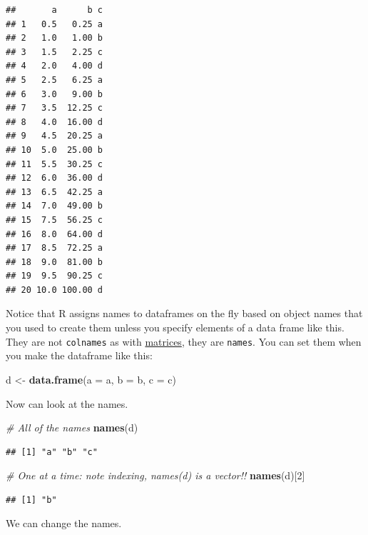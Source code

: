 \documentclass[
]{book}
\newenvironment{Shaded}{\begin{snugshade}}{\end{snugshade}}
\newcommand{\CommentTok}[1]{\textcolor[rgb]{0.56,0.35,0.01}{\textit{#1}}}
\newcommand{\DataTypeTok}[1]{\textcolor[rgb]{0.13,0.29,0.53}{#1}}
\newcommand{\DecValTok}[1]{\textcolor[rgb]{0.00,0.00,0.81}{#1}}
\newcommand{\KeywordTok}[1]{\textcolor[rgb]{0.13,0.29,0.53}{\textbf{#1}}}
\newcommand{\NormalTok}[1]{#1}
\newcommand{\StringTok}[1]{\textcolor[rgb]{0.31,0.60,0.02}{#1}}
\begin{document}
\begin{verbatim}
##       a      b c
## 1   0.5   0.25 a
## 2   1.0   1.00 b
## 3   1.5   2.25 c
## 4   2.0   4.00 d
## 5   2.5   6.25 a
## 6   3.0   9.00 b
## 7   3.5  12.25 c
## 8   4.0  16.00 d
## 9   4.5  20.25 a
## 10  5.0  25.00 b
## 11  5.5  30.25 c
## 12  6.0  36.00 d
## 13  6.5  42.25 a
## 14  7.0  49.00 b
## 15  7.5  56.25 c
## 16  8.0  64.00 d
## 17  8.5  72.25 a
## 18  9.0  81.00 b
## 19  9.5  90.25 c
## 20 10.0 100.00 d
\end{verbatim}

Notice that R assigns names to dataframes on the fly based on object names that you used to create them unless you specify elements of a data frame like this. They are not \texttt{colnames} as with \protect\hyperlink{matrices}{matrices}, they are \texttt{names}. You can set them when you make the dataframe like this:

\begin{Shaded}
\begin{Highlighting}[]
\NormalTok{d <-}\StringTok{ }\KeywordTok{data.frame}\NormalTok{(}\DataTypeTok{a =}\NormalTok{ a, }\DataTypeTok{b =}\NormalTok{ b, }\DataTypeTok{c =}\NormalTok{ c)}
\end{Highlighting}
\end{Shaded}

Now can look at the names.

\begin{Shaded}
\begin{Highlighting}[]
\CommentTok{# All of the names}
\KeywordTok{names}\NormalTok{(d)}
\end{Highlighting}
\end{Shaded}

\begin{verbatim}
## [1] "a" "b" "c"
\end{verbatim}

\begin{Shaded}
\begin{Highlighting}[]
\CommentTok{# One at a time: note indexing, names(d) is a vector!!}
\KeywordTok{names}\NormalTok{(d)[}\DecValTok{2}\NormalTok{]}
\end{Highlighting}
\end{Shaded}

\begin{verbatim}
## [1] "b"
\end{verbatim}

We can change the names.
\end{document}
